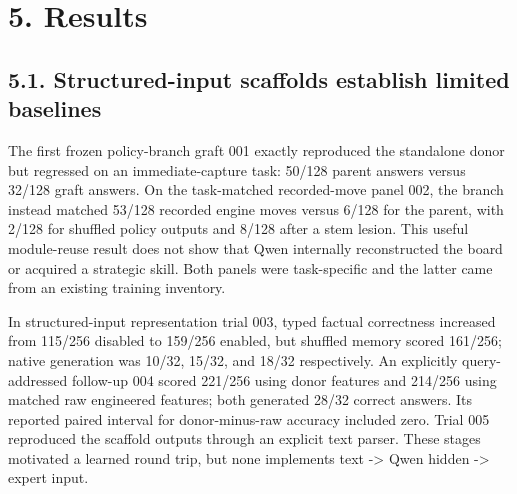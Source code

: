 \documentclass[11pt]{article}
\begin{document}
\section*{5. Results}
\subsection*{5.1. Structured-input scaffolds establish limited baselines}
The first frozen policy-branch graft 001 exactly reproduced the standalone donor but regressed on an immediate-capture task: 50/128 parent answers versus 32/128 graft answers. On the task-matched recorded-move panel 002, the branch instead matched 53/128 recorded engine moves versus 6/128 for the parent, with 2/128 for shuffled policy outputs and 8/128 after a stem lesion. This useful module-reuse result does not show that Qwen internally reconstructed the board or acquired a strategic skill. Both panels were task-specific and the latter came from an existing training inventory.

In structured-input representation trial 003, typed factual correctness increased from 115/256 disabled to 159/256 enabled, but shuffled memory scored 161/256; native generation was 10/32, 15/32, and 18/32 respectively. An explicitly query-addressed follow-up 004 scored 221/256 using donor features and 214/256 using matched raw engineered features; both generated 28/32 correct answers. Its reported paired interval for donor-minus-raw accuracy included zero. Trial 005 reproduced the scaffold outputs through an explicit text parser. These stages motivated a learned round trip, but none implements text -> Qwen hidden -> expert input.
\end{document}
